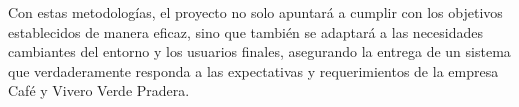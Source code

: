 Con estas metodologías, el proyecto no solo apuntará a cumplir con los objetivos establecidos de manera eficaz, sino que también se adaptará a las necesidades cambiantes del entorno y los usuarios finales, asegurando la entrega de un sistema que verdaderamente responda a las expectativas y requerimientos de la empresa Café y Vivero Verde Pradera.